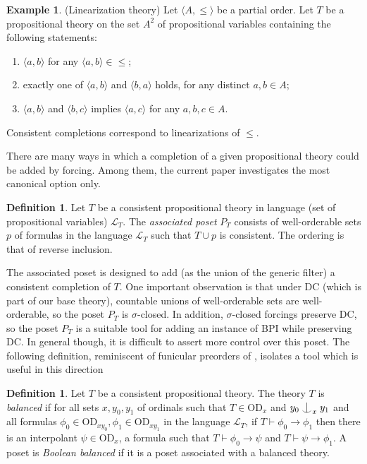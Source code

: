 \documentclass{article}
\newcommand{\gs}{\sigma}
\newcommand{\forkindep}[1][]{%
  \mathrel{
    \mathop{
      \vcenter{
        \hbox{\oalign{\noalign{\kern-.3ex}\hfil$\vert$\hfil\cr
              \noalign{\kern-.7ex}
              $\smile$\cr\noalign{\kern-.3ex}}}
      }
    }\displaylimits_{#1}
  }
}
\newcommand{\vd}{\mathrm{OD}}
\theoremstyle{definition}
\newtheorem{definition}[theorem]{Definition}
\newtheorem{example}[theorem]{Example}
\begin{document}
\begin{example}
	\label{linearizationexample}
	(Linearization theory) Let $\langle A, \leq\rangle$ be a partial order. Let $T$ be a propositional theory on the set $A^2$ of propositional variables containing the following statements:
	
	\begin{enumerate}
		\item $\langle a, b\rangle$ for any $\langle a, b\rangle\in\leq$;
		\item exactly one of $\langle a, b\rangle$ and $\langle b, a\rangle$ holds, for any distinct $a, b\in A$;
		\item $\langle a, b\rangle$ and $\langle b, c\rangle$ implies $\langle a, c\rangle$ for any $a, b, c\in A$.
	\end{enumerate}
	
	\noindent Consistent completions correspond to linearizations of $\leq$.
\end{example}

\noindent There are many ways in which a completion of a given propositional theory could be added by forcing. Among them, the current paper investigates the most canonical option only.
	
	\begin{definition}
		Let $T$ be a consistent propositional theory in language (set of propositional variables) $\mathcal{L}_T$. The \emph{associated poset} $P_T$ consists of well-orderable sets $p$ of formulas in the language $\mathcal{L}_T$ such that $T\cup p$ is consistent. The ordering is that of reverse inclusion.
	\end{definition}



\noindent The associated poset is designed to add (as the union of the generic filter) a consistent completion of $T$. One important observation is that under DC (which is part of our base theory), countable unions of well-orderable sets are well-orderable, so the poset $P_T$ is $\gs$-closed. In addition, $\gs$-closed forcings preserve DC, so the poset $P_T$ is a suitable tool for adding an instance of BPI while preserving DC. In general though, it is difficult to assert more control over this poset. The following definition, reminiscent of funicular preorders of \cite{azul:funicular}, isolates a tool which is useful in this direction


\begin{definition}
	\label{maindefinition}
	Let $T$ be a consistent propositional theory. The theory $T$ is \emph{balanced} if for all sets $x, y_0, y_1$ of ordinals such that $T\in\vd_x$ and $y_0\forkindep_xy_1$ and all formulas $\phi_0\in\vd_{xy_0}, \phi_1\in\vd_{xy_1}$ in the language $\mathcal{L}_T$, if $T\vdash\phi_0\to\phi_1$ then there is an interpolant $\psi\in\vd_x$, a formula such that $T\vdash\phi_0\to\psi$ and $T\vdash\psi\to\phi_1$.
	A poset is \emph{Boolean balanced} if it is a poset associated with a balanced theory.
\end{definition}
\end{document}
